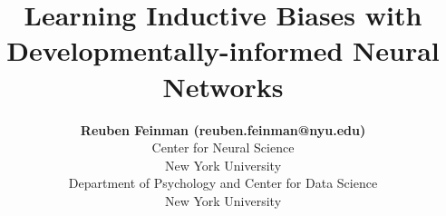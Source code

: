 \documentclass[10pt,letterpaper]{article}
\title{Learning Inductive Biases with Developmentally-informed Neural Networks}
\author{{\large \bf Reuben Feinman (reuben.feinman@nyu.edu)} \\
  Center for Neural Science \\
  New York University
  \AND {\large \bf Brenden M. Lake (brenden@nyu.edu)} \\
  Department of Psychology and Center for Data Science \\
  New York University}
\begin{document}
\maketitle


\begin{abstract}
    
\end{abstract}











\setlength{\bibleftmargin}{.125in}
\setlength{\bibindent}{-\bibleftmargin}


\end{document}
